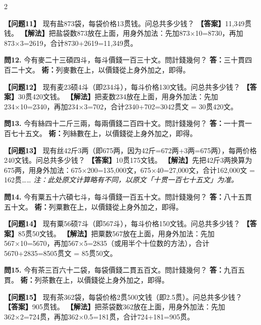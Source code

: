 \documentclass[11pt,a4paper]{article}
\begin{document}
\begin{paracol}{2}
\switchcolumn

\textbf{【问题11】} 现有盐873袋，每袋价格13贯钱。问总共多少钱？\break
\textbf{【答案】}11,349贯钱。\break
\textbf{【解法】}把盐袋数873放在上面，用身外加法：先加873×10=8730，再加873×3=2619，合计8730+2619=11,349贯。

\switchcolumn*

\textbf{問12.} 今有麥二十三碩四斗，每斗價錢一百三十文。問計錢幾何？\break
\textbf{答：}三十貫四百二十文。\break
\textbf{術：}列麥數在上，以價錢從上身外加之，即得。

\switchcolumn

\textbf{【问题12】} 现有麦23硕4斗（即234斗），每斗价格130文钱。问总共多少钱？\break
\textbf{【答案】}30贯420文钱。\break
\textbf{【解法】}把麦数234放在上面，用身外加法：先加234×10=2340，再加234×3=702，合计2340+702=3042贯文 = 30贯420文。

\switchcolumn*

\textbf{問13.} 今有絲四十二斤三兩，每兩價錢二百四十文。問計錢幾何？\break
\textbf{答：}一十貫一百七十五文。\break
\textbf{術：}列絲數在上，以價錢從上身外加之，即得。

\switchcolumn

\textbf{【问题13】} 现有丝42斤3两（即675两，因为42斤=672两+3两=675两），每两价格240文钱。问总共多少钱？\break
\textbf{【答案】}10贯175文钱。\break
\textbf{【解法】}先把42斤3两换算为675两，用身外加法：675×200=135,000文，675×40=27,000文，合计162,000文 = 162贯……\break
\textit{注：此处原文计算略有不同，以原文「十贯一百七十五文」为准。}

\switchcolumn*

\textbf{問14.} 今有粟五十六碩七斗，每斗價錢一百五十文。問計錢幾何？\break
\textbf{答：}八十五貫五十文。\break
\textbf{術：}列粟數在上，以價錢從上身外加之，即得。

\switchcolumn

\textbf{【问题14】} 现有粟56硕7斗（即567斗），每斗价格150文钱。问总共多少钱？\break
\textbf{【答案】}85贯50文钱。\break
\textbf{【解法】}把粟数567放在上面，用身外加法：先加567×10=5670，再加567×5=2835（或用半个十位数的方法），合计5670+2835=8505贯文 = 85贯50文。

\switchcolumn*

\textbf{問15.} 今有茶三百六十二袋，每袋價錢二貫五百文。問計錢幾何？\break
\textbf{答：}九百五貫。\break
\textbf{術：}列茶數在上，以價錢從上身外加之，即得。

\switchcolumn

\textbf{【问题15】} 现有茶362袋，每袋价格2贯500文钱（即2.5贯）。问总共多少钱？\break
\textbf{【答案】}905贯钱。\break
\textbf{【解法】}把茶袋数362放在上面，用身外加法：先加362×2=724贯，再加362×0.5=181贯，合计724+181=905贯。


\end{paracol}
\end{document}
